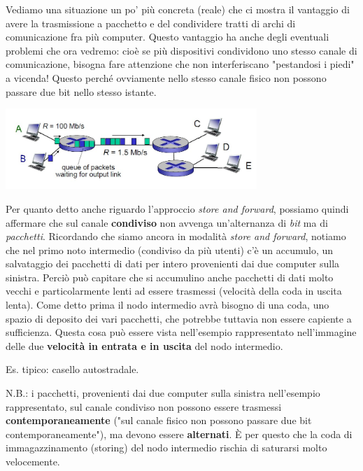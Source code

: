 \documentclass[10pt, a4paper, openany]{book}
\begin{document}
\noindent Vediamo una situazione un po' più concreta (reale) che ci mostra il vantaggio di avere la trasmissione a pacchetto e del condividere tratti di archi di comunicazione fra più computer. Questo vantaggio ha anche degli eventuali problemi che ora vedremo: cioè se più dispositivi condividono uno stesso canale di comunicazione, bisogna fare attenzione che non interferiscano "pestandosi i piedi" a vicenda! Questo perché ovviamente nello stesso canale fisico non possono passare due bit nello stesso istante. 
\begin{center}
    \includegraphics[width=95mm]{cap1 - Introduzione alle reti - 10.jpg}
\end{center}
\noindent Per quanto detto anche riguardo l'approccio \textit{store and forward}, possiamo quindi affermare che sul canale \textbf{condiviso} non avvenga un'alternanza di \textit{bit} ma di \textit{pacchetti}. Ricordando che siamo ancora in modalità \textit{store and forward}, notiamo che nel primo noto intermedio (condiviso da più utenti) c'è un accumulo, un salvataggio dei pacchetti di dati per intero provenienti dai due computer sulla sinistra. Perciò può capitare che si accumulino anche pacchetti di dati molto vecchi e particolarmente lenti ad essere trasmessi (velocità della coda in uscita lenta). Come detto prima il nodo intermedio avrà bisogno di una coda, uno spazio di deposito dei vari pacchetti, che potrebbe tuttavia non essere capiente a sufficienza. Questa cosa può essere vista nell'esempio rappresentato nell'immagine delle due \textbf{velocità in entrata e in uscita} del nodo intermedio.

\noindent Es. tipico: casello autostradale.

\noindent N.B.: i pacchetti, provenienti dai due computer sulla sinistra nell'esempio rappresentato, sul canale condiviso non possono essere trasmessi \textbf{contemporaneamente} ("sul canale fisico non possono passare due bit contemporaneamente"), ma devono essere \textbf{alternati}. È per questo che la coda di immagazzinamento (storing) del nodo intermedio rischia di saturarsi molto velocemente.

\vspace{0.5cm}
\end{document}
